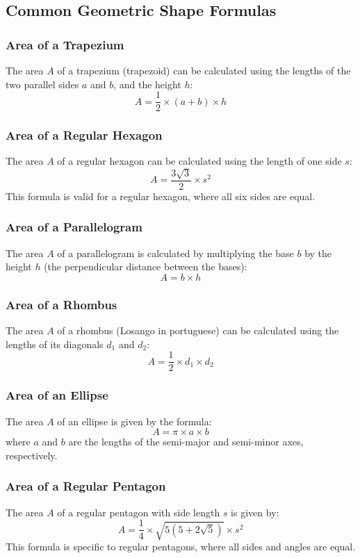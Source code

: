 \subsection{Common Geometric Shape Formulas}

\subsubsection{Area of a Trapezium}

The area \( A \) of a trapezium (trapezoid) can be calculated using the lengths of the two parallel sides \( a \) and \( b \), and the height \( h \):
\[
A = \frac{1}{2} \times (a + b) \times h
\]

\subsubsection{Area of a Regular Hexagon}

The area \( A \) of a regular hexagon can be calculated using the length of one side \( s \):
\[
A = \frac{3\sqrt{3}}{2} \times s^2
\]
This formula is valid for a regular hexagon, where all six sides are equal.

\subsubsection{Area of a Parallelogram}

The area \( A \) of a parallelogram is calculated by multiplying the base \( b \) by the height \( h \) (the perpendicular distance between the bases):
\[
A = b \times h
\]

\subsubsection{Area of a Rhombus}

The area \( A \) of a rhombus (Losango in portuguese) can be calculated using the lengths of its diagonals \( d_1 \) and \( d_2 \):
\[
A = \frac{1}{2} \times d_1 \times d_2
\]

\subsubsection{Area of an Ellipse}

The area \( A \) of an ellipse is given by the formula:
\[
A = \pi \times a \times b
\]
where \( a \) and \( b \) are the lengths of the semi-major and semi-minor axes, respectively.

\subsubsection{Area of a Regular Pentagon}

The area \( A \) of a regular pentagon with side length \( s \) is given by:
\[
A = \frac{1}{4} \times \sqrt{5(5 + 2\sqrt{5})} \times s^2
\]
This formula is specific to regular pentagons, where all sides and angles are equal.
